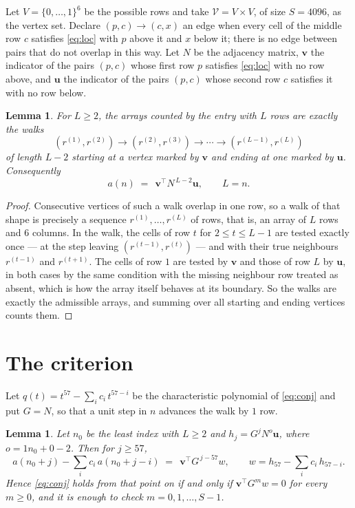 \documentclass[11pt,a4paper]{article}
\theoremstyle{plain}
\newtheorem{lemma}[theorem]{Lemma}
\theoremstyle{definition}
\begin{document}
Let $V=\{0,\dots,1\}^{6}$ be the possible rows and take
$\mathcal V=V\times V$, of size $S=4096$, as the vertex set. Declare $(p,c)\to(c,x)$ an edge
when every cell of the middle row $c$ satisfies \eqref{eq:loc} with $p$ above it and $x$
below it; there is no edge between pairs that do not overlap in this way. Let $N$ be the
adjacency matrix, $\mathbf{v}$ the indicator of the pairs $(p,c)$ whose first row $p$
satisfies \eqref{eq:loc} with no row above, and $\mathbf{u}$ the indicator of
the pairs $(p,c)$ whose second row $c$ satisfies it with no row below.

\begin{lemma}\label{lem:walk}
For $L\ge2$, the arrays counted by the entry with $L$ rows are exactly the walks
\[
(r^{(1)},r^{(2)})\to(r^{(2)},r^{(3)})\to\cdots\to(r^{(L-1)},r^{(L)})
\]
of length $L-2$ starting at a vertex marked by $\mathbf{v}$ and ending at one marked by
$\mathbf{u}$. Consequently
\[
a(n)\;=\;\,\mathbf{v}^{\!\top}N^{\,L-2}\mathbf{u},\qquad L=n .
\]
\end{lemma}

\begin{proof}
Consecutive vertices of such a walk overlap in one row, so a walk of that shape is
precisely a sequence $r^{(1)},\dots,r^{(L)}$ of rows, that is, an array of $L$ rows
and $6$ columns. In the walk, the cells of row $t$ for $2\le t\le L-1$ are tested
exactly once --- at the step leaving $(r^{(t-1)},r^{(t)})$ --- and with their true
neighbours $r^{(t-1)}$ and $r^{(t+1)}$. The cells of row $1$ are tested by
$\mathbf{v}$ and those of row $L$ by $\mathbf{u}$, in both cases by the same condition
with the missing neighbour row treated as absent, which is how the array itself behaves at
its boundary. So the walks are exactly the admissible arrays, and summing over all starting
and ending vertices counts them.
\end{proof}

\section{The criterion}

Let $q(t)=t^{57}-\sum_i c_i\,t^{57-i}$ be the characteristic polynomial of
\eqref{eq:conj} and put $G=N$, so that a unit step in $n$ advances the walk by
$1$ row.

\begin{lemma}\label{lem:crit}
Let $n_0$ be the least index with $L\ge2$ and $h_j=G^{j}N^{o}\mathbf{u}$, where
$o=1n_0+0-2$. Then for $j\ge57$,
\[
a(n_0+j)-\sum_i c_i\,a(n_0+j-i)\;=\;\,\mathbf{v}^{\!\top}G^{\,j-57}w,
\qquad w=h_{57}-\sum_i c_i\,h_{57-i} .
\]
Hence \eqref{eq:conj} holds from that point on if and only if
$\mathbf{v}^{\!\top}G^{m}w=0$ for every $m\ge0$, and it is enough to check
$m=0,1,\dots,S-1$.
\end{lemma}
\end{document}
